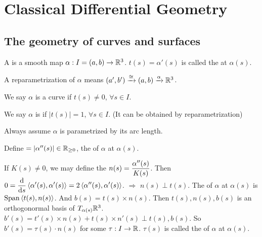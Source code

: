 
\section{Classical Differential Geometry}
\subsection{The geometry of curves and surfaces}
A  is a smooth map  $ \alpha:I=(a,b)\rightarrow \mathbb R^3 $.  $ t(s)=\alpha'(s) $ is called the   at  $ \alpha(s) $.

A reparametrization of  $ \alpha $ means  $ (a',b')\xrightarrow{\cong}(a,b)\xrightarrow{\alpha}\mathbb R^3 $.

We say  $ \alpha  $ is a  curve if  $ t(s)\neq 0 $,  $ \forall s\in I $.

We say  $ \alpha  $ is  if  $ |t(s)|=1 $, $ \forall s\in I $. (It can be obtained by reparametrization)

Always assume  $ \alpha  $ is parametrized by its arc length.

Define  $= |\alpha''(s)|\in \mathbb R_{ \geq 0} $, the  of  $ \alpha $ at  $ \alpha(s) $.    

If  $ K(s)\neq 0 $, we may define the   $ n(s)=\displaystyle\frac{\alpha''(s)}{K(s)} $. Then  $ 0=\displaystyle\frac{\mathrm{d}}{\mathrm{d} s}\left<\alpha'(s),\alpha'(s)\right>=2\left<\alpha''(s),\alpha'(s)\right> $. $ \Rightarrow $  $ n(s)\perp t(s) $.   The  of  $ \alpha  $ at  $ \alpha(s) $ is  $ \mathrm{Span}\left<t(s),n(s)\right> $.   And   $ b(s)=t(s)\times n(s) $. Then  $ t(s),n(s),b(s) $ is an orthogonormal basis  of  $ T_{\alpha(s)}\mathbb R^3 $.  $ b'(s)=t'(s)\times n(s)+t(s)\times n'(s)\perp t(s),b(s) $. So  $ b'(s)=\tau(s)\cdot n(s) $ for some  $ \tau:I\rightarrow \mathbb R $.  $ \tau(s) $ is called the  of  $ \alpha  $ at  $ \alpha(s) $.

